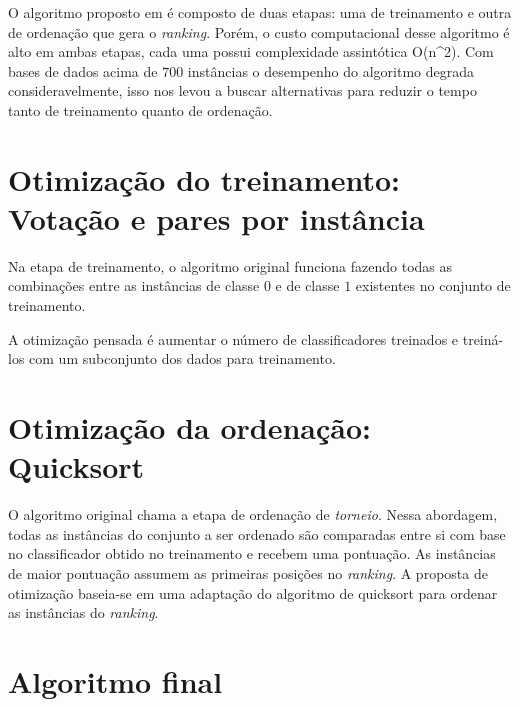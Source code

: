 O algoritmo proposto em \cite{langford08} é composto de duas etapas: uma de treinamento e outra de ordenação que gera o \emph{ranking}. Porém, o custo computacional desse algoritmo é alto em ambas etapas, cada uma possui complexidade assintótica O(n^2). Com bases de dados acima de $700$ instâncias o desempenho do algoritmo degrada consideravelmente, isso nos levou a buscar alternativas para reduzir o tempo tanto de treinamento quanto de ordenação.

\section{Otimização do treinamento: Votação e pares por instância}
Na etapa de treinamento, o algoritmo original funciona fazendo todas as combinações entre as instâncias de classe $0$ e de classe $1$ existentes no conjunto de treinamento.

A otimização pensada é aumentar o número de classificadores treinados e treiná-los com um subconjunto dos dados para treinamento.

\section{Otimização da ordenação: Quicksort}
O algoritmo original chama a etapa de ordenação de \emph{torneio}. Nessa abordagem, todas as instâncias do conjunto a ser ordenado são comparadas entre si com base no classificador obtido no treinamento e recebem uma pontuação. As instâncias de maior pontuação assumem as primeiras posições no \emph{ranking}. A proposta de otimização baseia-se em uma adaptação do algoritmo de quicksort para ordenar as instâncias do \emph{ranking}.

\section{Algoritmo final}

